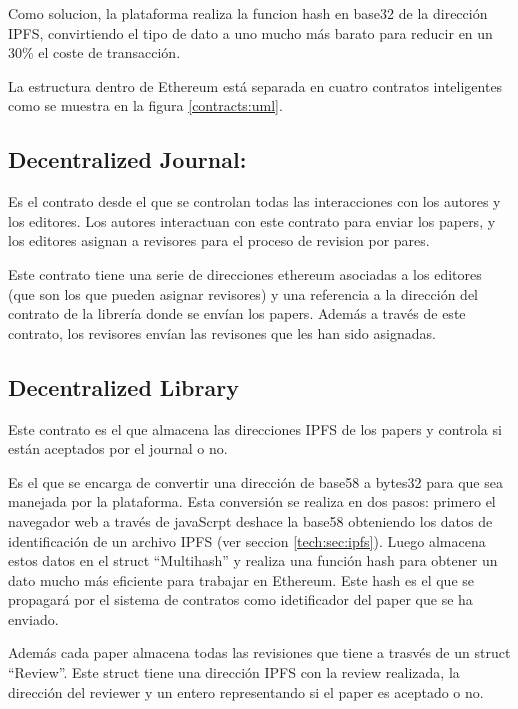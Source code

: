 Como solucion, la plataforma realiza la funcion hash en base32 de la dirección
IPFS, convirtiendo el tipo de dato a uno mucho más barato para reducir en un
30\% el coste de transacción.



La estructura dentro de Ethereum está separada en cuatro contratos inteligentes
como se muestra en la figura \ref{contracts:uml}.

\subsection*{Decentralized Journal:} Es el contrato desde el que se controlan
todas las interacciones con los autores y los editores. Los autores interactuan
con este contrato para enviar los papers, y los editores asignan a revisores
para el proceso de revision por pares.

Este contrato tiene una serie de direcciones ethereum asociadas a los editores
(que son los que pueden asignar revisores) y una referencia a la dirección del
contrato de la librería donde se envían los papers. Además a través de este
contrato, los revisores envían las revisones que les han sido asignadas.

\subsection*{Decentralized Library} Este contrato es el que almacena las
direcciones IPFS de los papers y controla si están aceptados por el journal o
no.

Es el que se encarga de convertir una dirección de base58 a bytes32 para que sea
manejada por la plataforma. Esta conversión se realiza en dos pasos: primero el
navegador web a través de javaScrpt deshace la base58 obteniendo los datos de
identificación de un archivo IPFS (ver seccion \ref{tech:sec:ipfs}). Luego
almacena estos datos en el struct ``Multihash'' y realiza una función hash para
obtener un dato mucho más eficiente para trabajar en Ethereum. Este hash es el
que se propagará por el sistema de contratos como idetificador del paper que se
ha enviado.

Además cada paper almacena todas las revisiones que tiene a trasvés de un struct
``Review''. Este struct tiene una dirección IPFS con la review realizada, la
dirección del reviewer y un entero representando si el paper es aceptado o no.

